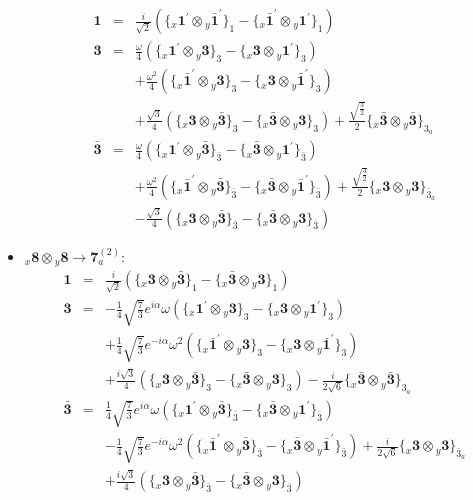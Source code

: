 \documentclass[english]{article}
\newcommand{\rep}[1]{\mathbf{#1}}
\newcommand{\repx}[2]{{}_{#2}\mathbf{#1}}
\newcommand{\subcg}[3]{\big\{ \repx{#1}{x}\otimes\repx{#2}{y}\big\}^{}_{#3}}
\begin{document}
\begin{itemize}
\begin{eqnarray*}
\rep{1} &=& \frac{i}{\sqrt{2}}\left(\subcg{1^{\prime}}{\bar{1}^{\prime}}{1}-\subcg{\bar{1}^{\prime}}{1^{\prime}}{1}\right)
\\
\rep{3} &=& \frac{\omega }{4}\left(\subcg{1^{\prime}}{3}{3}-\subcg{3}{1^{\prime}}{3}\right) \\ 
 & & +\frac{\omega ^2}{4}\left(\subcg{\bar{1}^{\prime}}{3}{3}-\subcg{3}{\bar{1}^{\prime}}{3}\right) \\ 
 & & +\frac{\sqrt{3}}{4}\left(\subcg{3}{\bar{3}}{3}-\subcg{\bar{3}}{3}{3}\right)+\frac{\sqrt{\frac{3}{2}}}{2}\subcg{\bar{3}}{\bar{3}}{3_{a}}
\\
\rep{\bar{3}} &=& \frac{\omega }{4}\left(\subcg{1^{\prime}}{\bar{3}}{\bar{3}}-\subcg{\bar{3}}{1^{\prime}}{\bar{3}}\right) \\ 
 & & +\frac{\omega ^2}{4}\left(\subcg{\bar{1}^{\prime}}{\bar{3}}{\bar{3}}-\subcg{\bar{3}}{\bar{1}^{\prime}}{\bar{3}}\right)+\frac{\sqrt{\frac{3}{2}}}{2}\subcg{3}{3}{\bar{3}_{a}} \\ 
 & & -\frac{\sqrt{3}}{4}\left(\subcg{3}{\bar{3}}{\bar{3}}-\subcg{\bar{3}}{3}{\bar{3}}\right)
\end{eqnarray*}
\item $\repx{8}{x}\otimes\repx{8}{y}\to\rep{7}_{a}^{(2)}$:
\begin{eqnarray*}
\rep{1} &=& \frac{i}{\sqrt{2}}\left(\subcg{3}{\bar{3}}{1}-\subcg{\bar{3}}{3}{1}\right)
\\
\rep{3} &=& -\frac{1}{4} \sqrt{\frac{7}{3}} e^{i \alpha } \omega\left(\subcg{1^{\prime}}{3}{3}-\subcg{3}{1^{\prime}}{3}\right) \\ 
 & & +\frac{1}{4} \sqrt{\frac{7}{3}} e^{-i \alpha } \omega ^2\left(\subcg{\bar{1}^{\prime}}{3}{3}-\subcg{3}{\bar{1}^{\prime}}{3}\right) \\ 
 & & +\frac{i \sqrt{3}}{4}\left(\subcg{3}{\bar{3}}{3}-\subcg{\bar{3}}{3}{3}\right)-\frac{i}{2 \sqrt{6}}\subcg{\bar{3}}{\bar{3}}{3_{a}}
\\
\rep{\bar{3}} &=& \frac{1}{4} \sqrt{\frac{7}{3}} e^{i \alpha } \omega\left(\subcg{1^{\prime}}{\bar{3}}{\bar{3}}-\subcg{\bar{3}}{1^{\prime}}{\bar{3}}\right) \\ 
 & & -\frac{1}{4} \sqrt{\frac{7}{3}} e^{-i \alpha } \omega ^2\left(\subcg{\bar{1}^{\prime}}{\bar{3}}{\bar{3}}-\subcg{\bar{3}}{\bar{1}^{\prime}}{\bar{3}}\right)+\frac{i}{2 \sqrt{6}}\subcg{3}{3}{\bar{3}_{a}} \\ 
 & & +\frac{i \sqrt{3}}{4}\left(\subcg{3}{\bar{3}}{\bar{3}}-\subcg{\bar{3}}{3}{\bar{3}}\right)
\end{eqnarray*}

\end{itemize}
\end{document}
